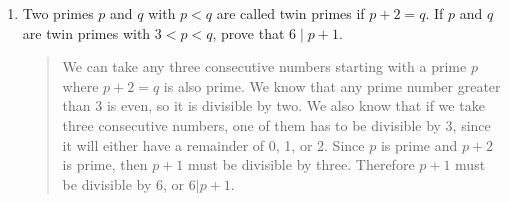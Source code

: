 \documentclass{hw}
\begin{document}
\begin{enumerate}
\item Two primes $p$ and $q$ with $p<q$ are called twin primes if $p+2=q$. If $p$ and $q$ are twin primes
with $3 < p < q$, prove that $6 \mid p + 1$.
\begin{quote}
We can take any three consecutive numbers starting with a prime $p$ where $p+2=q$ is also prime. We know
that any prime number greater than 3 is even, so it is divisible by two. We also know that if we take
three consecutive numbers, one of them has to be divisible by 3, since it will either have a remainder of
0, 1, or 2. Since $p$ is prime and $p+2$ is prime, then $p+1$ must be divisible by three. Therefore
$p+1$ must be divisible by 6, or $6|p+1$.
\end{quote}
\end{enumerate}
\end{document}
